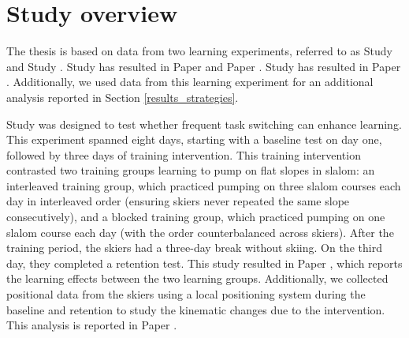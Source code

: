 

\section{Study overview}
The thesis is based on data from two learning experiments, referred to as Study   and Study . Study  has resulted in Paper  and Paper . Study  has resulted in Paper . Additionally, we used data from this learning experiment for an additional analysis reported in Section \ref{results_strategies}.

Study  was designed to test whether frequent task switching can enhance learning. This experiment spanned eight days, starting with a baseline test on day one, followed by three days of training intervention. This training intervention contrasted two training groups learning to pump on flat slopes in slalom: an interleaved training group, which practiced pumping on three slalom courses each day in interleaved order (ensuring skiers never repeated the same slope consecutively), and a blocked training group, which practiced pumping on one slalom course each day (with the order counterbalanced across skiers). After the training period, the skiers had a three-day break without skiing. On the third day, they completed a retention test. This study resulted in Paper , which reports the learning effects between the two learning groups. Additionally, we collected positional data from the skiers using a local positioning system during the baseline and retention to study the kinematic changes due to the intervention. This analysis is reported in Paper . 

